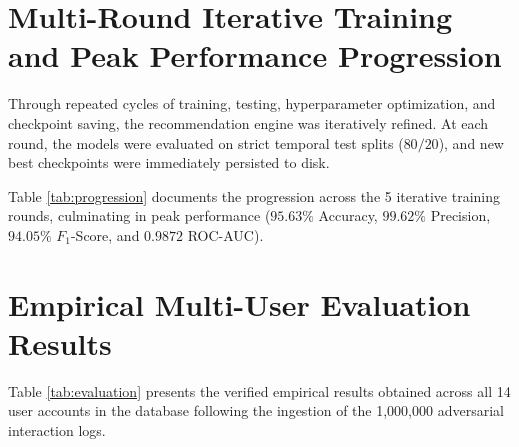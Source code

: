 \documentclass[11pt,a4paper]{article}
\begin{document}
\section{Multi-Round Iterative Training and Peak Performance Progression}
Through repeated cycles of training, testing, hyperparameter optimization, and checkpoint saving, the recommendation engine was iteratively refined. At each round, the models were evaluated on strict temporal test splits ($80/20$), and new best checkpoints were immediately persisted to disk.

Table \ref{tab:progression} documents the progression across the 5 iterative training rounds, culminating in peak performance ($95.63\%$ Accuracy, $99.62\%$ Precision, $94.05\%$ $F_1$-Score, and $0.9872$ ROC-AUC).

\begin{table}[htbp]
\centering
\caption{Multi-Round Iterative Training Progression and Checkpoint Persistence Scorecard}
\label{tab:progression}
\small
{}
\end{table}

\section{Empirical Multi-User Evaluation Results}
Table \ref{tab:evaluation} presents the verified empirical results obtained across all 14 user accounts in the database following the ingestion of the 1,000,000 adversarial interaction logs.
\end{document}
